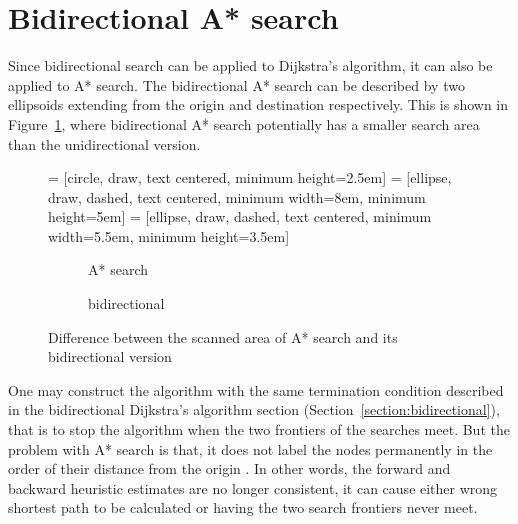 \section{Bidirectional A* search}
Since bidirectional search can be applied to Dijkstra's algorithm,
it can also be applied to A* search.
The bidirectional A* search can be described by two ellipsoids extending from the origin and destination respectively.
This is shown in Figure~\ref{fig:bidirectdiff},
where bidirectional A* search potentially has a smaller search area than the unidirectional version.

\begin{figure}[H]
     = [circle, draw, text centered, minimum height=2.5em]
     = [ellipse, draw, dashed, text centered, minimum width=8em, minimum height=5em]
     = [ellipse, draw, dashed, text centered, minimum width=5.5em, minimum height=3.5em]
    \centering
    \begin{subfigure}[t]{.4\textwidth}
        \centering
        \caption{A* search}
    \end{subfigure}
    \begin{subfigure}[t]{.4\textwidth}
        \centering
        \caption{bidirectional}
    \end{subfigure}
    \caption{Difference between the scanned area of A* search and its bidirectional version}
    \label{fig:bidirectdiff}
\end{figure}

One may construct the algorithm with the same termination condition described in the bidirectional Dijkstra's algorithm section (Section~\ref{section:bidirectional}),
that is to stop the algorithm when the two frontiers of the searches meet.
But the problem with A* search is that, it does not label the nodes permanently in the order of their distance from the origin \citep{Klunder}.
In other words, the forward and backward heuristic estimates are no longer consistent,
it can cause either wrong shortest path to be calculated or having the two search frontiers never meet.

